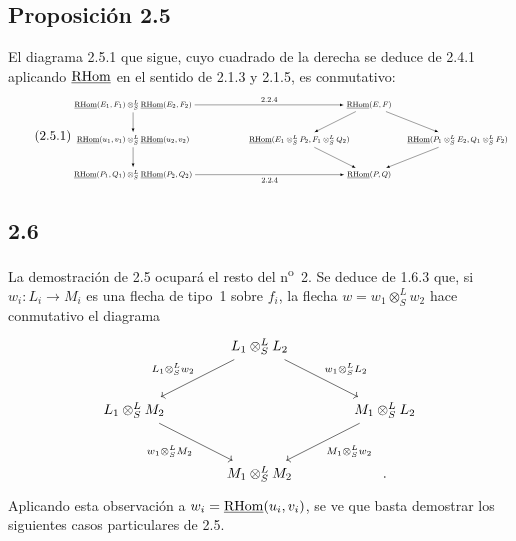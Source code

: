 \subsection*{Proposición 2.5}
El diagrama 2.5.1 que sigue, cuyo cuadrado de la derecha se deduce de 2.4.1 aplicando $\underline{\mathrm{RHom}}$ en el sentido de 2.1.3 y 2.1.5, es conmutativo:
\begin{equation}\tag{2.5.1}
\resizebox{0.98\textwidth}{!}{%
\begin{tikzpicture}[>=latex,baseline=(current bounding box.center)]
\footnotesize
\node (A) at (0,2.6) {$\uRHom(E_1,F_1)\otimes^L_S\uRHom(E_2,F_2)$};
\node (B) at (0,1.3) {$\uRHom(u_1,v_1)\otimes^L_S\uRHom(u_2,v_2)$};
\node (C) at (0,0) {$\uRHom(P_1,Q_1)\otimes^L_S\uRHom(P_2,Q_2)$};
\node (D) at (8.8,2.6) {$\uRHom(E,F)$};
\node (E) at (6.2,1.3) {$\uRHom(E_1\otimes^L_SP_2,F_1\otimes^L_SQ_2)$};
\node (F) at (12.1,1.3) {$\uRHom(P_1\otimes^L_SE_2,Q_1\otimes^L_SF_2)$};
\node (G) at (8.8,0) {$\uRHom(P,Q)$};
\draw[->] (A) -- node[above] {$2.2.4$} (D);
\draw[->] (A) -- (B);
\draw[->] (B) -- (C);
\draw[->] (C) -- node[below] {$2.2.4$} (G);
\draw[->] (D) -- (E);
\draw[->] (D) -- (F);
\draw[->] (E) -- (G);
\draw[->] (F) -- (G);
\end{tikzpicture}}
\end{equation}

\subsection*{2.6}
La demostración de 2.5 ocupará el resto del n\textsuperscript{o}~2. Se deduce de 1.6.3 que, si $w_i:L_i\to M_i$ es una flecha de tipo~1 sobre $f_i$, la flecha $w=w_1\otimes^{L}_{S}w_2$ hace conmutativo el diagrama
\[
\begin{tikzcd}[column sep=large,row sep=large]
& L_1\otimes^L_S L_2 \arrow[dl,"{L_1\otimes^L_S w_2}"'] \arrow[dr,"{w_1\otimes^L_S L_2}"] & \\
L_1\otimes^L_S M_2 \arrow[dr,"{w_1\otimes^L_S M_2}"'] & & M_1\otimes^L_S L_2 \arrow[dl,"{M_1\otimes^L_S w_2}"]\\
& M_1\otimes^L_S M_2 & .
\end{tikzcd}
\]
Aplicando esta observación a $w_i=\underline{\mathrm{RHom}}(u_i,v_i)$, se ve que basta demostrar los siguientes casos particulares de 2.5.


